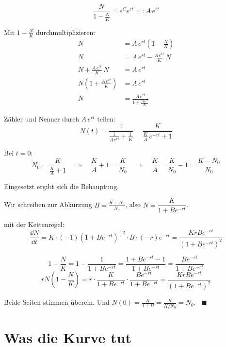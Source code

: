 \begin{merksatz}
\[ \frac{N}{1-\frac{N}{K}} = e^{C}e^{rt} =: A\,e^{rt} \]

Mit $1-\frac{N}{K}$ durchmultiplizieren:
\begin{align*}
N &= A\,e^{rt}\left(1-\frac{N}{K}\right)\\
N &= A\,e^{rt} - \frac{A\,e^{rt}}{K}\,N\\
N + \frac{A\,e^{rt}}{K}\,N &= A\,e^{rt}\\
N\left(1 + \frac{A\,e^{rt}}{K}\right) &= A\,e^{rt}\\
N &= \frac{A\,e^{rt}}{1 + \frac{A\,e^{rt}}{K}}
\end{align*}

Zähler und Nenner durch $A\,e^{rt}$ teilen:
\[ N(t) = \frac{1}{\frac{1}{A\,e^{rt}} + \frac{1}{K}} = \frac{K}{\frac{K}{A}\,e^{-rt} + 1} \]

Bei $t=0$:
\[ N_0 = \frac{K}{\frac{K}{A} + 1} \quad\Longrightarrow\quad \frac{K}{A} + 1 = \frac{K}{N_0} \quad\Longrightarrow\quad \frac{K}{A} = \frac{K}{N_0} - 1 = \frac{K-N_0}{N_0} \]

Eingesetzt ergibt sich die Behauptung.

Wir schreiben zur Abkürzung $B = \frac{K-N_0}{N_0}$, also $N = \dfrac{K}{1+Be^{-rt}}$.

 mit der Kettenregel:
\[ \frac{\dd N}{\dd t} = K \cdot \left(-1\right)\left(1+Be^{-rt}\right)^{-2}\cdot B\cdot(-r)e^{-rt} = \frac{KrBe^{-rt}}{\left(1+Be^{-rt}\right)^{2}} \]

\[ 1 - \frac{N}{K} = 1 - \frac{1}{1+Be^{-rt}} = \frac{1+Be^{-rt}-1}{1+Be^{-rt}} = \frac{Be^{-rt}}{1+Be^{-rt}} \]
\[ rN\left(1-\frac{N}{K}\right) = r\cdot\frac{K}{1+Be^{-rt}}\cdot\frac{Be^{-rt}}{1+Be^{-rt}} = \frac{KrBe^{-rt}}{\left(1+Be^{-rt}\right)^{2}} \]

Beide Seiten stimmen überein. Und $N(0) = \frac{K}{1+B} = \frac{K}{K/N_0} = N_0$. \checkmark\ $\blacksquare$
\end{merksatz}

\section{Was die Kurve tut}

